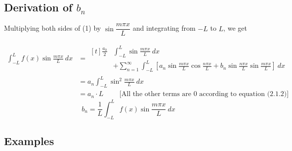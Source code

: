\documentclass[12pt]{article}
\numberwithin{equation}{subsection}
\begin{document}
\subsection{Derivation of $b_n$}
Multiplying both sides of (1) by $\sin{\dfrac{m\pi x}{L}}$ and integrating from $-L$ to $L$, we get

\begin{align*}
    \int_{-L}^{L} {f(x) \sin{\frac{m\pi x}{L}}} \: d{x} &=
    \begin{aligned}[t]
        \frac{a_0}{2} &\int_{-L}^{L} {\sin{\frac{m\pi x}{L}}} \: d{x} \\
        & + \sum_{n=1}^{\infty} \int_{-L}^{L} \left[ a_n \sin{\frac{m\pi x}{L}} \cos{\frac{n\pi x}{L}} + b_n \sin{\frac{n\pi x}{L}} \sin{\frac{m\pi x}{L}} \right] \: d{x}
    \end{aligned} \\
    &= a_n \int_{-L}^{L} {\sin^2{\frac{m\pi x}{L}}} \: d{x} \\
    &= a_n \cdot L \qquad \text{ [All the other terms are $0$ according to equation (2.1.2)] }
\end{align*}
\[ \boxed{ b_n = \frac{1}{L} \int_{-L}^{L} {f(x) \sin{\frac{m\pi x}{L}}} \: d{x} } \]


\subsection{Examples}
\end{document}
